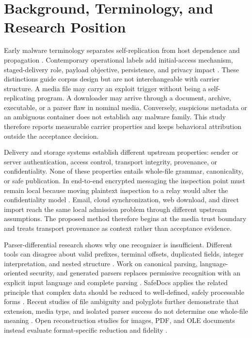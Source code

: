 \section{Background, Terminology, and Research Position}
\label{sec:background}

Early malware terminology separates self-replication from host dependence and
propagation \cite{cohen1987,spafford1989}. Contemporary operational labels add
initial-access mechanism, staged-delivery role, payload objective, persistence,
and privacy impact \cite{nist80083,kharraz2016,scaife2016}. These distinctions
guide corpus design but are not interchangeable with carrier structure.
A media file may carry an exploit trigger without being a self-replicating
program. A downloader may arrive through a document, archive, executable, or a
parser flaw in nominal media. Conversely, suspicious metadata or an ambiguous
container does not establish any malware family. This study therefore reports
measurable carrier properties and keeps behavioral attribution outside the
acceptance decision.

Delivery and storage systems establish different upstream properties: sender or
server authentication, access control, transport integrity, provenance, or
confidentiality. None of these properties entails whole-file grammar,
canonicality, or safe publication. In end-to-end encrypted messaging the
inspection point must remain local because moving plaintext inspection to a
relay would alter the confidentiality model \cite{unger2015,cohngordon2020,
abelson2024}. Email, cloud synchronization, web download, and direct import
reach the same local admission problem through different upstream assumptions.
The proposed method therefore begins at the media trust boundary and treats
transport provenance as context rather than acceptance evidence.

Parser-differential research shows why one recognizer is insufficient. Different
tools can disagree about valid prefixes, terminal offsets, duplicated fields,
integer interpretation, and nested structure \cite{jana2012,momot2016}. Work on
canonical parsing, language-oriented security, and generated parsers replaces
permissive recognition with an explicit input language and complete parsing
\cite{samuel2012,nail2014,everparse2019,ipg2023}. SafeDocs applies the related
principle that complex data should be reduced to well-defined, safely processable
forms \cite{darpaSafeDocs}.
Recent studies of file ambiguity and polyglots further demonstrate that
extension, media type, and isolated parser success do not determine one
whole-file meaning \cite{koch2025,you2025}. Open reconstruction studies for
images, PDF, and OLE documents instead evaluate format-specific reduction and
fidelity \cite{belkind2023,dubin2023,dubin2024ole}.

